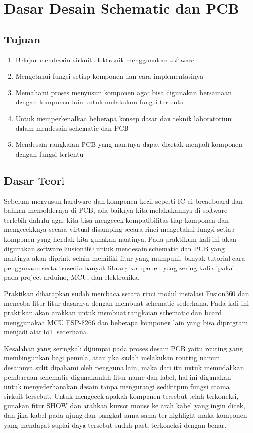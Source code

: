 \chapter{Dasar Desain Schematic dan PCB}

\section{Tujuan}
\begin{enumerate}
    \item Belajar mendesain sirkuit elektronik menggunakan software
    \item Mengetahui fungsi setiap komponen dan cara implementasinya
    \item Memahami proses menyusun komponen agar bisa digunakan bersamaan dengan komponen lain untuk melakukan fungsi tertentu
    \item Untuk memperkenalkan beberapa konsep dasar dan teknik laboratorium dalam mendesain schematic dan PCB
    \item Mendesain rangkaian PCB yang nantinya dapat dicetak menjadi komponen dengan fungsi tertentu
\end{enumerate}


\section{Dasar Teori}
Sebelum menyusun hardware dan komponen kecil seperti IC di breadboard dan
bahkan mensoldernya di PCB, ada baiknya kita melakukannya di software terlebih dahulu agar
kita bisa mengecek kompatibilitas tiap komponen dan mengecekknya secara virtual
disamping secara rinci mengetahui fungsi setiap komponen yang hendak kita gunakan
nantinya. Pada praktikum kali ini akan digunakan software Fusion360 untuk mendesain
schematic dan PCB yang nantinya akan diprint, selain memiliki fitur yang mumpuni, banyak
tutorial cara penggunaan serta tersedia banyak library komponen yang sering kali dipakai
pada project arduino, MCU, dan elektronika.

Praktikan diharapkan sudah membaca secara rinci modul instalasi Fusion360 dan mencoba fitur-fitur dasarnya dengan membuat schematic sederhana. Pada kali ini praktikan
akan arahkan untuk membuat rangkaian schematic dan board menggunakan MCU ESP-8266
dan beberapa komponen lain yang bisa diprogram menjadi alat IoT sederhana.

Kesalahan yang seringkali dijumpai pada proses desain PCB yaitu routing yang
membingunkan bagi pemula, atau jika sudah melakukan routing namun desainnya sulit
dipahami oleh pengguna lain, maka dari itu untuk memudahkan pembacaan schematic
digunakanlah fitur name dan label, hal ini digunakan untuk menyederhanakan desain tanpa
mengurangi sedikitpun fungsi utama sirkuit tersebut. Untuk mengecek apakah komponen
tersebut telah terkoneksi, gunakan fitur SHOW dan arahkan kursor mouse ke arah kabel yang
ingin dicek, dan jika kabel pada ujung dan pangkal sama-sama ter-highlight maka komponen
yang mendapat suplai daya tersebut sudah pasti terkoneksi dengan benar.

